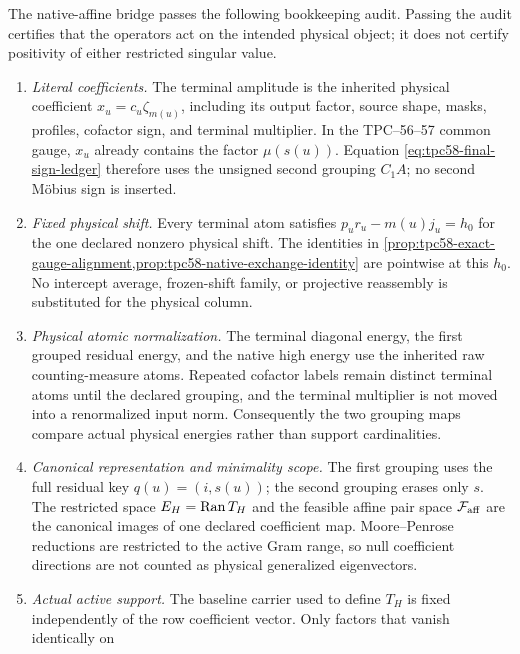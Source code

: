 The native-affine bridge passes the following bookkeeping audit.  Passing
the audit certifies that the operators act on the intended physical object;
it does not certify positivity of either restricted singular value.
\begin{enumerate}[label=\textup{(A\arabic*)},leftmargin=3.2em]
 \item \emph{Literal coefficients.}
       The terminal amplitude is the inherited physical coefficient
       \(x_u=c_u\zeta_{m(u)}\), including its output factor, source shape,
       masks, profiles, cofactor sign, and terminal multiplier.  In the
       TPC--56--57 common gauge, \(x_u\) already contains the factor
       \(\mu(s(u))\).  Equation \eqref{eq:tpc58-final-sign-ledger} therefore
       uses the unsigned second grouping \(C_1A\); no second M\"obius sign is
       inserted.
 \item \emph{Fixed physical shift.}
       Every terminal atom satisfies
       \(p_ur_u-m(u)j_u=h_0\) for the one declared nonzero physical shift.
       The identities in
       \cref{prop:tpc58-exact-gauge-alignment,prop:tpc58-native-exchange-identity}
       are pointwise at this \(h_0\).  No intercept average, frozen-shift
       family, or projective reassembly is substituted for the physical
       column.
 \item \emph{Physical atomic normalization.}
       The terminal diagonal energy, the first grouped residual energy, and
       the native high energy use the inherited raw counting-measure atoms.
       Repeated cofactor labels remain distinct terminal atoms until the
       declared grouping, and the terminal multiplier is not moved into a
       renormalized input norm.  Consequently the two grouping maps compare
       actual physical energies rather than support cardinalities.
 \item \emph{Canonical representation and minimality scope.}
       The first grouping uses the full residual key \(q(u)=(i,s(u))\); the
       second grouping erases only \(s\).  The restricted space
       \(E_H=\operatorname{Ran} T_H\) and the feasible affine pair space
       \(\mathcal F_{\rm aff}\) are the canonical images of one declared coefficient
       map.  Moore--Penrose reductions are restricted to the active Gram
       range, so null coefficient directions are not counted as physical
       generalized eigenvectors.
 \item \emph{Actual active support.}
       The baseline carrier used to define \(T_H\) is fixed independently of
       the row coefficient vector.  Only factors that vanish identically on

\end{enumerate}
